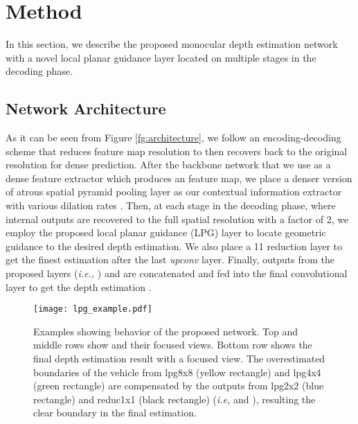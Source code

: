 \documentclass[10pt,twocolumn,letterpaper]{article}
\begin{document}
\section{Method}
\label{sec:method}
In this section, we describe the proposed monocular depth estimation network with a novel local planar guidance layer located on multiple stages in the decoding phase.

\subsection{Network Architecture}
As it can be seen from Figure \ref{fg:architecture}, we follow an encoding-decoding scheme that reduces feature map resolution to  then recovers back to the original resolution  for dense prediction. 
After the backbone network that we use as a dense feature extractor which produces an  feature map, we place a denser version \cite{yang2018denseaspp} of atrous spatial pyramid pooling layer \cite{chen2018deeplab} as our contextual information extractor with various dilation rates .
Then, at each stage in the decoding phase, where internal outputs are recovered to the full spatial resolution with a factor of 2, we employ the proposed local planar guidance (LPG) layer to locate geometric guidance to the desired depth estimation.
We also place a 11 reduction layer to get the finest estimation  after the last \textit{upconv} layer.
Finally, outputs from the proposed layers (\textit{i.e.,} ) and  are concatenated and fed into the final convolutional layer to get the depth estimation .

\begin{figure}[t!]
	\centering
	\footnotesize
	\texttt{[image: lpg\_example.pdf]}
	\caption{Examples showing behavior of the proposed network. Top and middle rows show  and their focused views. Bottom row shows the final depth estimation result with a focused view. The overestimated boundaries of the vehicle from lpg8x8 (yellow rectangle) and lpg4x4 (green rectangle) are compensated by the outputs from lpg2x2 (blue rectangle) and reduc1x1 (black rectangle) (\textit{i.e,}  and ), resulting the clear boundary in the final estimation.}
	\label{fg:lpg_examples}
	\vspace{-0.4cm}
\end{figure}
\end{document}
